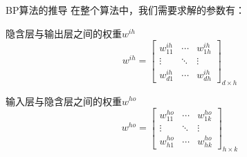 \documentclass[hyperref,UTF8,11pt]{beamer}
\begin{document}
\begin{frame}{BP算法的推导}
在整个算法中，我们需要求解的参数有：
    \begin{block}{隐含层与输出层之间的权重$w^{ih}$}
        \begin{equation}
{w^{ih}} = {\left[ {\begin{array}{*{20}{c}}
{w_{11}^{ih}}& \cdots &{w_{1h}^{ih}}\\
 \vdots & \ddots & \vdots \\
{w_{d1}^{ih}}& \cdots &{w_{dh}^{ih}}
\end{array}} \right]_{d \times h}}
		\end{equation}
    \end{block}
	
	\begin{block}{输入层与隐含层之间的权重$w^{ho}$}
        \begin{equation}
{w^{ho}} = {\left[ {\begin{array}{*{20}{c}}
{w_{11}^{ho}}& \cdots &{w_{1k}^{ho}}\\
 \vdots & \ddots & \vdots \\
{w_{h1}^{ho}}& \cdots &{w_{hk}^{ho}}
\end{array}} \right]_{h \times k}}
		\end{equation}
    \end{block}
\end{frame}
\end{document}
